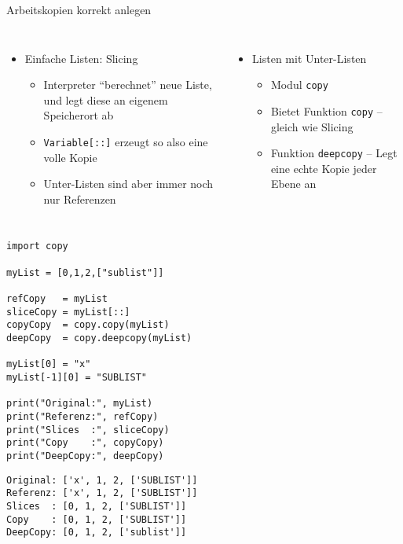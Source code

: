 
\begin{frame}[fragile]{Arbeitskopien korrekt anlegen}
%
\begin{columns}[T]
\begin{itemize}
\item Einfache Listen: Slicing
	\begin{itemize}
	\item Interpreter \enquote{berechnet} neue Liste, und legt diese an eigenem Speicherort ab
	\item \texttt{Variable[::]} erzeugt so also eine volle Kopie
	\item Unter-Listen sind aber immer noch nur Referenzen
	\end{itemize}
\end{itemize}
%
\begin{itemize}
\item Listen mit Unter-Listen
	\begin{itemize}
	\item Modul \texttt{copy}
	\item Bietet Funktion \texttt{copy} -- gleich wie Slicing
	\item Funktion \texttt{deepcopy} -- Legt eine echte Kopie jeder Ebene an
	\end{itemize}
\end{itemize}
\end{columns}
%
\end{frame}


\begin{frame}[fragile]
%
\begin{tcbraster}[raster columns=2,
                  raster equal height,
                  nobeforeafter,
                  raster column skip=0.5cm]
\begin{codebox}
\begin{verbatim}
import copy

myList = [0,1,2,["sublist"]]

refCopy   = myList
sliceCopy = myList[::]
copyCopy  = copy.copy(myList)
deepCopy  = copy.deepcopy(myList)

myList[0] = "x"
myList[-1][0] = "SUBLIST"

print("Original:", myList)
print("Referenz:", refCopy)
print("Slices  :", sliceCopy)
print("Copy    :", copyCopy)
print("DeepCopy:", deepCopy)
\end{verbatim}
\end{codebox}
%
\begin{cmdbox}[Ausgabe]
\begin{verbatim}
Original: ['x', 1, 2, ['SUBLIST']]
Referenz: ['x', 1, 2, ['SUBLIST']]
Slices  : [0, 1, 2, ['SUBLIST']]
Copy    : [0, 1, 2, ['SUBLIST']]
DeepCopy: [0, 1, 2, ['sublist']]
\end{verbatim}
\end{cmdbox}
\end{tcbraster}
%
\end{frame}

